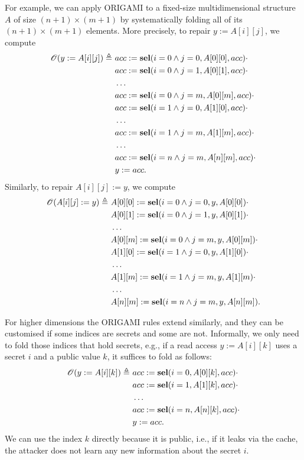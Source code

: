 {For example, we can apply ORIGAMI to a fixed-size multidimensional structure $A$ of size $(n+1)\times (m+1)$ by systematically folding all of its $(n+1)\times (m+1)$ elements. More precisely, to repair $y:=A[i][j]$, we compute
\begin{align*}
    \mathscr{O}(y:=A[i][j])\triangleq\  
    &acc:=\textbf{sel}(i=0\land j=0,A[0][0],acc)\cdot \\
    &acc:=\textbf{sel}(i=0\land j=1,A[0][1],acc)\cdot \\
    &\ldots\\
    &acc:=\textbf{sel}(i=0\land j=m,A[0][m],acc)\cdot \\
    &acc:=\textbf{sel}(i=1\land j=0,A[1][0],acc)\cdot \\
    &\ldots\\
    &acc:=\textbf{sel}(i=1\land j=m,A[1][m],acc)\cdot \\
    &\ldots\\
    &acc:=\textbf{sel}(i=n\land j=m,A[n][m],acc)\cdot \\
    &y:=acc.
\end{align*}
Similarly, to repair $A[i][j]:=y$, we compute
\begin{align*}
    \mathscr{O}(A[i][j]:=y)\triangleq\  
    &A[0][0]:=\textbf{sel}(i=0\land j=0,y,A[0][0])\cdot \\
    &A[0][1]:=\textbf{sel}(i=0\land j=1,y,A[0][1])\cdot \\
    &\ldots\\
    &A[0][m]:=\textbf{sel}(i=0\land j=m,y,A[0][m])\cdot \\
    &A[1][0]:=\textbf{sel}(i=1\land j=0,y,A[1][0])\cdot \\
    &\ldots\\
    &A[1][m]:=\textbf{sel}(i=1\land j=m,y,A[1][m)\cdot \\
    &\ldots\\
    &A[n][m]:=\textbf{sel}(i=n\land j=m,y,A[n][m]).
\end{align*}

For higher dimensions the ORIGAMI rules extend similarly, and they can be customised if some indices are secrets and some are not. Informally, we only need to fold those indices that hold secrets, e.g., if a read access $y:=A[i][k]$ uses a secret $i$ and a public value $k$, it suffices to fold as follows: 
\begin{align*}
    \mathscr{O}(y:=A[i][k])\triangleq\  
    &acc:=\textbf{sel}(i=0,A[0][k],acc)\cdot \\
    &acc:=\textbf{sel}(i=1,A[1][k],acc)\cdot \\
    &\ldots\\
    &acc:=\textbf{sel}(i=n,A[n][k],acc)\cdot \\
    &y:=acc.
\end{align*}
We can use the index $k$ directly because it is public, i.e., if it leaks via the cache, the attacker does not learn any new information about the secret $i$.

}

